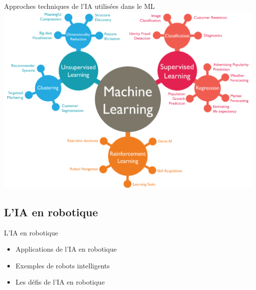 \documentclass{beamer}
\begin{document}
\begin{frame}{Approches techniques de l'IA utilisées dans le ML}
	\centering
	\includegraphics[width=0.9\linewidth]{tml.png}
\end{frame}


{
\subsection{L'IA en robotique}
\begin{frame}{L'IA en robotique}
	\Large
	\begin{itemize}
		\item Applications de l'IA en robotique
		\item Exemples de robots intelligents
		\item Les défis de l'IA en robotique
	\end{itemize}
\end{frame}
}
\end{document}
